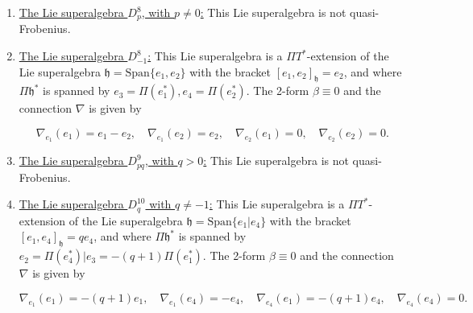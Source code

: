 \documentclass[12pt]{amsart}
\newcommand{\fh}{\mathfrak{h}}
\begin{document}
\begin{enumerate}
    \[\nabla_{e_1}(e_1) = -e_1,\quad  \nabla_{e_1}(e_2) = e_2, \quad  \nabla_{e_2}(e_1) = 0, \quad \nabla_{e_2}(e_2) = 0.\]

    In the case where the form is even, then this Lie superalgebra is a $ T^*$-extension of the Lie superalgebra $\mathfrak{h}=\mathrm{Span}\{e_1 | e_4\}$ with the bracket $[e_1,e_4]_\fh = -e_4$, and where $\mathfrak{h}^*$ is spanned by $e_2 = e_1^{*} | e_3 = e_4^{*}$. The 2-form $\alpha \equiv 0$ and the connection $\nabla$ is given by
    
    \[\nabla_{e_1}(e_1) = -e_1,\quad  \nabla_{e_1}(e_4) = -e_4, \quad  \nabla_{e_4}(e_1) = 0, \quad \nabla_{e_4}(e_4) = 0.\]

    \item \underline{The Lie superalgebra $D^{8}_{p}$, with $p\neq 0$:} This Lie superalgebra is not quasi-Frobenius. 

    \item \underline{The Lie superalgebra $D^{8}_{-1}$:} This Lie superalgebra is a $\Pi T^*$-extension of the Lie superalgebra $\mathfrak{h}=\mathrm{Span}\{e_1 ,  e_2\}$ with the bracket $[e_1,e_2]_\fh = e_2$, and where $\Pi \mathfrak{h}^*$ is spanned by $e_3 = \Pi(e_1^{*}) ,  e_4 = \Pi(e_2^{*})$. The 2-form $\beta \equiv 0$ and the connection $\nabla$ is given by
    
    \[\nabla_{e_1}(e_1) = e_1-e_2,\quad  \nabla_{e_1}(e_2) = e_2, \quad  \nabla_{e_2}(e_1) = 0, \quad \nabla_{e_2}(e_2) = 0.\]

    \item \underline{The Lie superalgebra $D^{9}_{pq}$, with $q> 0$:} This Lie superalgebra is not quasi-Frobenius. 

    \item \underline{The Lie superalgebra $D^{10}_{q}$ with $q\not =-1$:} This Lie superalgebra is a $\Pi T^*$-extension of the Lie superalgebra $\mathfrak{h}=\mathrm{Span}\{e_1 | e_4\}$ with the bracket $[e_1,e_4]_\fh = qe_4$, and where $\Pi \mathfrak{h}^*$ is spanned by $e_2 = \Pi(e_4^{*}) | e_3 =-(q+1) \Pi(e_1^{*})$. The 2-form $\beta \equiv 0$ and the connection $\nabla$ is given by
    
    \[\nabla_{e_1}(e_1) = -(q+1)e_1,\quad  \nabla_{e_1}(e_4) = -e_4, \quad  \nabla_{e_4}(e_1) =-(q+1) e_4, \quad \nabla_{e_4}(e_4) =0.\]


\end{enumerate}
\end{document}
